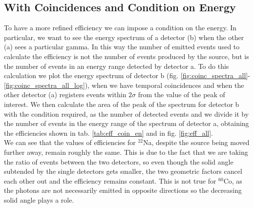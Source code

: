 \subsection{With Coincidences and Condition on Energy}

To have a more refined efficiency we can impose a condition on the energy. In particular, we want to see the energy spectrum of a detector (b) when the other (a) sees a particular gamma. In this way the number of emitted events used to calculate the efficiency is not the number of events produced by the source, but is the number of events in an energy range detected by detector a. To do this calculation we plot the energy spectrum of detector b (fig. \ref{fig:coinc_spectra_all}-\ref{fig:coinc_spectra_all_log}), when we have temporal coincidences and when the other detector (a) registers events within $2\sigma$ from the value of the peak of interest. We then calculate the area of the peak of the spectrum for detector b with the condition required, as the number of detected events and we divide it by the number of events in the energy range of the spectrum of detector a, obtaining the efficiencies shown in tab. \ref{tab:eff_coin_en} and in fig. \ref{fig:eff_all}. \\

We can see that the values of efficiencies for $^{22}$Na, despite the source being moved further away, remain roughly the same. This is due to the fact that we are taking the ratio of events between the two detectors, so even though the solid angle subtended by the single detectors gets smaller, the two geometric factors cancel each other out and the efficiency remains constant.
This is not true for $^{60}$Co, as the photons are not necessarily emitted in opposite directions so the decreasing solid angle plays a role.  

